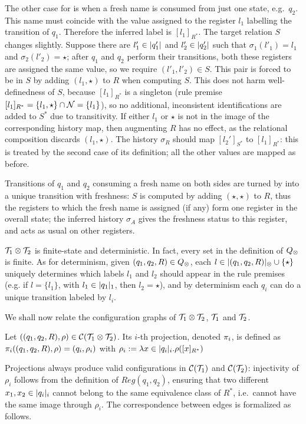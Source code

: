 The other case for \regrule{} is when a fresh name is consumed from just one state, e.g.\ $q_2$.
This name must coincide with the value assigned to the register $l_1$ labelling the transition of $q_1$. Therefore the inferred label is $[l_1]_{R^*}$. The target relation $S$ changes slightly. Suppose there are $l'_1 \in |q'_1|$ and $l'_2\in |q'_2|$ such that $\sigma_1(l'_1) = l_1$ and $\sigma_2(l'_2) = \star$; after $q_1$ and $q_2$ perform their transitions, both these registers are assigned the same value, so we require $(l'_1,l'_2) \in S$. This pair is forced to be in $S$ by adding $(l_1,\star)$ to $R$ when computing $S$. This does not harm well-definedness of $S$, because $[l_1]_{R^*}$ is a singleton (rule premise $[l_1]_{R^*} = \{l_1,\star\} \cap 	\mathcal{N} = \{l_1\}$), so no additional, inconsistent identifications are added to $S^*$ due to transitivity. If either $l_1$ or $\star$ is not in the image of the corresponding history map, then augmenting $R$ has no effect, as the relational composition discards $(l_1,\star)$. The history $\sigma_R$ should map $[l_2']_{S^*}$ to $[l_1]_{R^*}$: this is treated by the second case of its definition; all the other values are mapped as before.

Transitions of $q_1$ and $q_2$ consuming a fresh name on both sides are turned by \allrule{} into a unique transition with freshness: $S$ is computed by adding $(\star,\star)$ to $R$, thus the registers to which the fresh name is assigned (if any) form one register in the overall state; the inferred history $\sigma_A$ gives the freshness status to this register, and acts as usual on other registers.

\begin{remark}
\label{rem:syncp-fin-det}
$\mathcal{T}_1 \otimes \mathcal{T}_2$ is finite-state and deterministic. In fact, every set in the definition of $Q_{\otimes}$ is finite.
As for determinism, given $(q_1,q_2,R) \in Q_{\otimes}$, each $l \in |(q_1,q_2,R)|_{\otimes} \cup \{\star\}$ uniquely determines which labels $l_1$ and $l_2$ should appear in the rule premises (e.g. if $l = \{l_1\}$, with $l_1 \in |q_1|_1$, then $l_2 = \star$), and by determinism each $q_i$ can do a unique transition labeled by $l_i$.
\end{remark}
%
We shall now relate the configuration graphs of $\mathcal{T}_1 \otimes \mathcal{T}_2$, $\mathcal{T}_1$ and $\mathcal{T}_2$.
%
\begin{definition}
Let $((q_1,q_2,R),\rho) \in \mathcal{C}(\mathcal{T}_1 \otimes \mathcal{T}_2)$. Its $i$-th projection, denoted $\pi_i$, is defined as
$\pi_i((q_1,q_2,R),\rho) = (q_i,\rho_i)$ with $\rho_i := \lambda x \in |q_i|_i.\rho([x]_{R^*})$
\end{definition}
%
Projections always produce valid configurations in $\mathcal{C}(\mathcal{T}_1)$ and $\mathcal{C}(\mathcal{T}_2)$: injectivity of $\rho_i$ follows from the definition of $Reg(q_1,q_2)$, ensuring that two different $x_1,x_2 \in |q_i|_i$ cannot belong to the same equivalence class of $R^*$, i.e.\ cannot have the same image through $\rho_i$. The correspondence between edges is formalized as follows.

